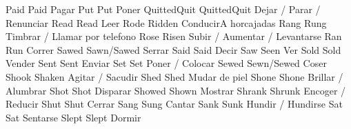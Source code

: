 	            {Paid}{}	            {Paid}{}                {Pagar}{}
	            {Put}{}	                {Put}{}                 {Poner}{}
	            {Quitted}{Quit}	        {Quitted}{Quit}         {Dejar / Parar / Renunciar}{}
	            {Read}{}	            {Read}{}                {Leer}{}
	            {Rode}{}	            {Ridden}{}              {Conducir}{A horcajadas}
	            {Rang}{}	            {Rung}{}                {Timbrar / Llamar por telefono}{}
	            {Rose}{}	            {Risen}{}               {Subir / Aumentar / Levantarse}{}
	            {Ran}{}	                {Run}{}                 {Correr}{}
	            {Sawed}{}	            {Sawn/Sawed}{}          {Serrar}{}
	            {Said}{}	            {Said}{}                {Decir}{}
	            {Saw}{}	                {Seen}{}                {Ver}{}
	            {Sold}{}	            {Sold}{}                {Vender}{}
	            {Sent}{}	            {Sent}{}                {Enviar}{}
	            {Set}{}	                {Set}{}                 {Poner / Colocar}{}
	            {Sewed}{}	            {Sewn/Sewed}{}          {Coser}{}
	            {Shook}{}	            {Shaken}{}              {Agitar / Sacudir}{}
	            {Shed}{}	            {Shed}{}                {Mudar de piel}{}
	            {Shone}{}	            {Shone}{}               {Brillar / Alumbrar}{}
	            {Shot}{}	            {Shot}{}                {Disparar}{}
	            {Showed}{}	            {Shown}{}               {Mostrar}{}
	            {Shrank}{}	            {Shrunk}{}              {Encoger / Reducir}{}
	            {Shut}{}	            {Shut}{}                {Cerrar}{}
	            {Sang}{}	            {Sung}{}                {Cantar}{}
	            {Sank}{}	            {Sunk}{}                {Hundir / Hundirse}{}
	            {Sat}{}	                {Sat}{}                 {Sentarse}{}
	            {Slept}{}	            {Slept}{}               {Dormir}{}
